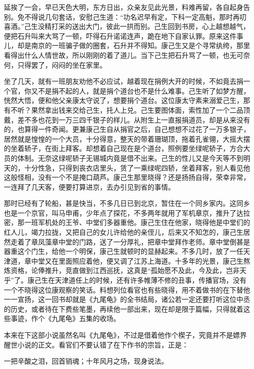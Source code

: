 \documentclass[12pt,UTF8]{ctexbook}
\begin{document}
{{{延挨了一会，早已天色大明，东方日出，众亲友见此光景，料难再留，各自起身告别。免不得说几句套话，安慰己生道：“功名迟早有定，下科一定高魁，那时再叨喜酒。”己生没精打采的送出大门，彼此一拱而别。己生回到书房，心上越想越气，便把石升叫来大骂了一顿，吓得石升诺诺连声，跪在地下自家认罪。原来这件事儿，却是南京的一班骗子做的圈套，石升并不得知。康己生又是个寻常纨绔，那里看得出什么人情世故，所以刚刚的着了道儿。当下己生把石升骂了一顿，也无可奈何，只得罢了，闷闷的坐在家里。

坐了几天，就有一班朋友劝他不必应试，越着现在捐例大开的时候，不如竟去捐一个官，你又不是捐不起的人，就是捐个道台也不是什么难事。己生听了如梦方醒，恍然大悟，便和他父亲康太守说了，想要捐个道台。这位康太守素来溺爱己生，那有不听？果然拿出钱来交给己生，托人上兑。己生要图体面，索性加了一个二品顶戴，差不多也花到一万三四千银子的样儿。从附生上一直报捐道员，却是从来没有的，也算得一件奇闻。更兼康己生自从捐官之后，自己想想不过花了一万多银子，居然就是惶惶的一个大员，十分得意，整天的带着珊瑚顶，拖着孔雀翎，大摇大摆的坐着轿子，在街上拜客。却想着自己现在是个道台，照例要坐绿呢轿子，方合大员的体制。无奈这绿呢轿子无锡城内竟是借不出来。己生的性儿又是今天等不到明天的，十分性急，只得到丧衣店里头，赁了一乘绿呢四轿，坐着拜客，别人看见他这般怪相，没有一个不是掩口葫芦。康己生那里晓得？还是扬扬自得，荣幸非常，一连拜了几天客，便要打算进京，去办引见到省的事情。

那时已经有了轮船，甚是快当，不多几日已到北京，暂住在一个同乡家内。这同乡也是一个京官，叫马申甫，少年点了探花，不多两年就用了军机章京，推升了达拉密，那一班军机处的王爷、中堂们多器重他。康己生住在他家，晓得他是中堂们的红人儿，竭力拉拢，又把自己的女儿许给他的亲侄儿，后来又不知怎的，康己生居然走着了章凤藻章中堂的门路，送了一分厚礼，把章中堂拜作老师。章中堂倒甚是器重这个门生，给他一个明保，康己生就顿时的显赫起来。不多几时，放了一任天津道，章中堂又在里面照应着他，便又调了江苏上海道。十多年的光景，康己生熬炼资格，论俸推升，竞直做到江西巡抚，这真是“孤始愿不及此，今及此，岂非天乎”了。康己生在天津道任上的时候，还有许多帷薄不修的丑事，传播官场，没有一个不晓得这位康观察的笑话。料想列位看官也有些晓得，用不着做书的在下替他一一宣扬，这一回书却就是《九尾龟》的全书结局，诸公若一定还要打听这位中丞的历史，或者待在下费些笔墨，再续他一部出来，现在却是限于篇幅，只得就着这些事迹，作个《九尾龟》五集的收场。

本来在下这部小说虽然名叫《九尾龟》，不过是借着他作个楔子，究竟并不是嫖界醒世小说的正文。看官们不要认错了在下作书的宗旨，正是：

一把辛酸之泪，回首销魂；十年风月之场，现身说法。





}}}
\end{document}
